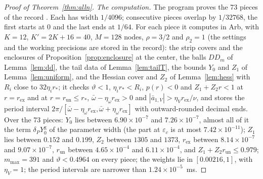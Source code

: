 \documentclass[11pt]{article}
\theoremstyle{definition}
\begin{document}
\begin{proof}[Proof of Theorem~\ref{thm:alln}]
\emph{The computation.} The program  proves the 73 pieces of the record . Each has width $1/4096$; consecutive pieces overlap by $1/32768$, the first starts at $0$ and the last ends at $1/64$. For each piece it computes in Arb, with $K = 12$, $K' = 2K + 16 = 40$, $M = 128$ nodes, $\rho = 3/2$ and $\rho_2 = 1$ (the settings and the working precisions are stored in the record): the strip covers and the enclosures of Proposition~\ref{prop:enclosure} at the center, the balls $DD_m$ of Lemma~\ref{lem:dd}, the tail data of Lemma~\ref{lem:tailT}, the bounds $Y_0$ and $Z_1$ of Lemma~\ref{lem:uniform}, and the Hessian cover and $Z_2$ of Lemma~\ref{lem:hess} with $R_i$ close to $32\eta_ir_*$; it checks $\vartheta < 1$, $\eta_ir_* < R_i$, $p(r) < 0$ and $Z_1 + Z_2r < 1$ at $r = r_{\mathrm{ex}}$ and at $r = r_{\mathrm{un}} \le r_*$, $\bar\omega - \eta_\omega r_{\mathrm{ex}} > 0$ and $|\bar a_{1,V}| > \eta_Vr_{\mathrm{ex}}/\nu$, and stores the period interval $2\pi/[\bar\omega - \eta_\omega r_{\mathrm{ex}}, \bar\omega + \eta_\omega r_{\mathrm{ex}}]$ with outward-rounded decimal ends. Over the 73 pieces: $Y_0$ lies between $6.90 \times 10^{-7}$ and $7.26 \times 10^{-7}$, almost all of it the term $\delta_PY^{\mathrm g}_0$ of the parameter width (the part at $\varepsilon_c$ is at most $7.42 \times 10^{-11}$); $Z_1$ lies between $0.152$ and $0.199$, $Z_2$ between $1305$ and $1373$, $r_{\mathrm{ex}}$ between $8.14 \times 10^{-7}$ and $9.07 \times 10^{-7}$, $r_{\mathrm{un}}$ between $4.65 \times 10^{-4}$ and $6.11 \times 10^{-4}$, and $Z_1 + Z_2r_{\mathrm{un}} \le 0.979$; $m_{\max} = 391$ and $\vartheta < 0.4964$ on every piece; the weights lie in $[0.00216, 1]$, with $\eta_V = 1$; the period intervals are narrower than $1.24 \times 10^{-5}$~ms.


\end{proof}
\end{document}

